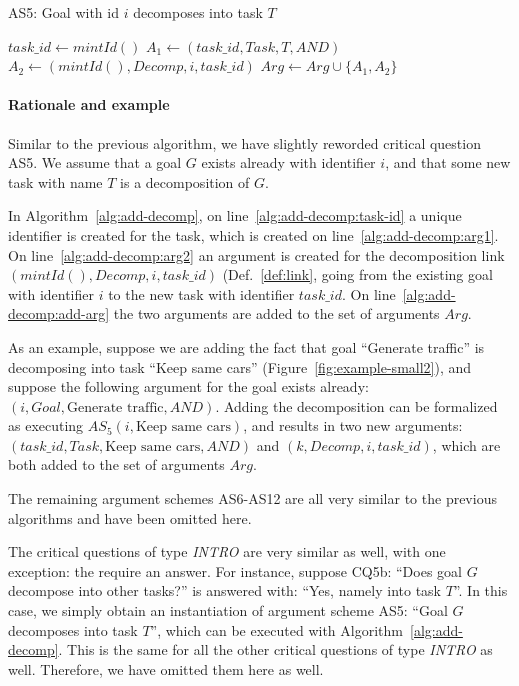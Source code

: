 \begin{algorithm}[h]
  \caption{AS5: Goal with id $i$ decomposes into task $T$}\label{alg:add-decomp}
  \begin{algorithmic}[1]
    \State $task\_id\gets mintId()$\label{alg:add-decomp:task-id}
    \State $A_1\leftarrow (task\_id, Task, T, AND)$\label{alg:add-decomp:arg1}
    \State $A_2\leftarrow (mintId(), Decomp, i, task\_id)$\label{alg:add-decomp:arg2}
    \State $Arg\gets Arg\cup \{A_1,A_2\}$\label{alg:add-decomp:add-arg}
    \EndProcedure
  \end{algorithmic}
\end{algorithm}

\paragraph{Rationale and example} Similar to the previous algorithm, we have slightly reworded critical question AS5. We assume that a goal $G$ exists already with identifier $i$, and that some new task with name $T$ is a decomposition of $G$. 

In Algorithm~\ref{alg:add-decomp}, on line~\ref{alg:add-decomp:task-id} a unique identifier is created for the task, which is created on line~\ref{alg:add-decomp:arg1}. On line~\ref{alg:add-decomp:arg2} an argument is created for the decomposition link $(mintId(), Decomp, i, task\_id)$ (Def.~\ref{def:link}, going from the existing goal with identifier $i$ to the new task with identifier $task\_id$. On line~\ref{alg:add-decomp:add-arg} the two arguments are added to the set of arguments $Arg$.

As an example, suppose we are adding the fact that goal ``Generate traffic'' is decomposing into task ``Keep same cars'' (Figure~\ref{fig:example-small2}), and suppose the following argument for the goal exists already: $(i, Goal,\text{Generate traffic}, AND)$. Adding the decomposition can be formalized as executing $AS_5(i, \text{Keep same cars})$, and results in two new arguments: $(task\_id, Task, \text{Keep same cars}, AND)$ and $(k, Decomp, i, task\_id)$, which are both added to the set of arguments $Arg$.

The remaining argument schemes AS6-AS12 are all very similar to the previous algorithms and have been omitted here.

The critical questions of type \emph{INTRO} are very similar as well, with one exception: the require an answer. For instance, suppose CQ5b: ``Does goal $G$ decompose into other tasks?'' is answered with: ``Yes, namely into task $T$''. In this case, we simply obtain an instantiation of argument scheme AS5: ``Goal $G$ decomposes into task $T$'', which can be executed with Algorithm~\ref{alg:add-decomp}. This is the same for all the other critical questions of type \emph{INTRO} as well. Therefore, we have omitted them here as well.

